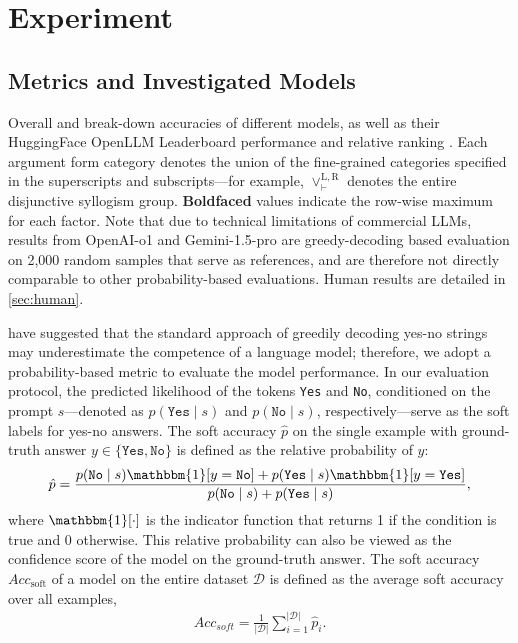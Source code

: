 \section{Experiment}
\label{sec:experiment}

\subsection{Metrics and Investigated Models}
\label{sec:experiment-measure}

\begin{table*}[!t]
    \centering
    
    \caption{
        Overall and break-down accuracies of different models, as well as their HuggingFace OpenLLM Leaderboard performance and relative ranking \citep{open-llm-leaderboard-v2}.
        Each argument form category denotes the union of the fine-grained categories specified in the superscripts and subscripts---for example, $\lor^{\mathrm{L}, \mathrm{R}}_{\vdash}$ denotes the entire disjunctive syllogism group.
        \textbf{Boldfaced} values indicate the row-wise maximum for each factor.
        Note that due to technical limitations of commercial LLMs, results from OpenAI-o1 \citep{openai-o1} and Gemini-1.5-pro \citep{team2024gemini} are greedy-decoding based evaluation on 2,000 random samples that serve as references, and are therefore not directly comparable to other probability-based evaluations.
        Human results are detailed in \cref{sec:human}.
    }
    \label{tab:softacc-base}
\end{table*}

\citet{huPromptingNotSubstitute2023} have suggested that the standard approach of greedily decoding yes-no strings \citep{dentella-etal-2023-systematic} may underestimate the competence of a language model; therefore, we adopt a probability-based metric to evaluate the model performance.
In our evaluation protocol, the predicted likelihood of the tokens \texttt{Yes} and \texttt{No}, conditioned on the prompt \(s\)---denoted as \(p(\texttt{Yes}\mid s)\) and \(p(\texttt{No}\mid s)\), respectively---serve as the soft labels for yes-no answers.
The soft accuracy $\hat p$ on the single example with ground-truth answer $y\in \{\texttt{Yes}, \texttt{No}\}$ is defined as the relative probability of $y$:
\noindent
$$
    \hat p = \frac{p(\texttt{No} \mid s)\mathbbm{1}[y = \texttt{No}] + p(\texttt{Yes} \mid s) \mathbbm{1}[y = \texttt{Yes}]}{p(\texttt{No} \mid s) + p(\texttt{Yes} \mid s)},
$$
\noindent
where $\mathbbm{1}[\cdot]$ is the indicator function that returns 1 if the condition is true and 0 otherwise.
This relative probability can also be viewed as the confidence score of the model on the ground-truth answer.
The soft accuracy \(\mathit{Acc}_\mathrm{soft}\) of a model on the entire dataset $\mathcal{D}$ is defined as the average soft accuracy over all examples,
\begin{align*}
    \mathit{Acc}_\textit{soft} = \frac{1}{\lvert\mathcal{D}\rvert} \sum_{i=1}^{\lvert \mathcal{D}\rvert} \hat p_i.
\end{align*}
\vspace{-10pt}

